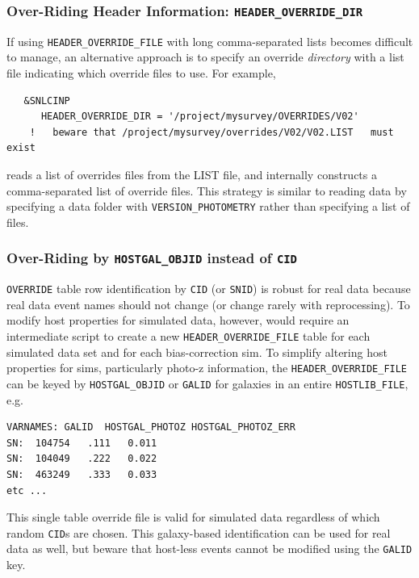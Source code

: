 \documentclass[12pt]{article}
\begin{document}
\subsubsection{Over-Riding Header Information: {\tt HEADER\_OVERRIDE\_DIR} }
\label{sss:header_override_dir}
%
If using \verb|HEADER_OVERRIDE_FILE| with long comma-separated lists becomes
difficult to manage, an alternative approach is to specify an override
{\it directory} with a list file indicating which override files to use.
For example,
\begin{verbatim}
   &SNLCINP
      HEADER_OVERRIDE_DIR = '/project/mysurvey/OVERRIDES/V02'
    !   beware that /project/mysurvey/overrides/V02/V02.LIST   must exist
\end{verbatim}
reads a list of overrides files from the LIST file, and internally
constructs a comma-separated list of override files. This strategy
is similar to reading data by specifying a data folder with
\verb|VERSION_PHOTOMETRY| rather than specifying a list of files.


\subsubsection{Over-Riding by {\tt HOSTGAL\_OBJID} instead of {\tt CID}}
\label{sss:header_override_galid}

{\tt OVERRIDE} table row identification by {\tt CID} (or {\tt SNID}) is robust for real data
because real data event names should not change (or change rarely with reprocessing).
To modify host properties for simulated data, however, would require an intermediate
script to create a new {\tt HEADER\_OVERRIDE\_FILE} table for each simulated data
set and for each bias-correction sim. To simplify altering host properties for sims,
particularly photo-z information, the {\tt HEADER\_OVERRIDE\_FILE} can be keyed
by {\tt HOSTGAL\_OBJID} or {\tt GALID} for galaxies in an entire {\tt HOSTLIB\_FILE}, e.g. 

\begin{verbatim}                                                                                                   
VARNAMES: GALID  HOSTGAL_PHOTOZ HOSTGAL_PHOTOZ_ERR
SN:  104754   .111   0.011
SN:  104049   .222   0.022
SN:  463249   .333   0.033
etc ...
\end{verbatim}
This single table override file is valid for simulated data regardless of which
random {\tt CID}s are chosen. This galaxy-based identification can be used for real
data as well, but beware that host-less events cannot be modified using the {\tt GALID} key.
\end{document}
